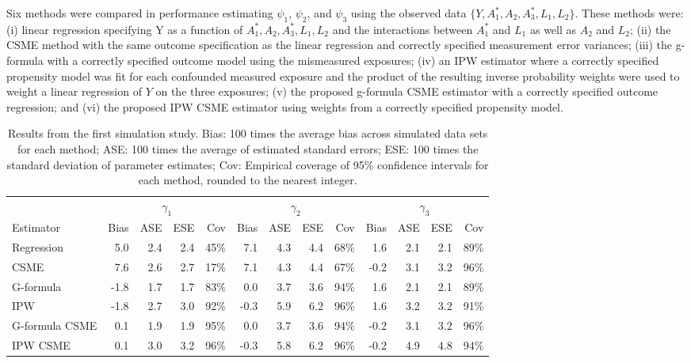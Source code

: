 \documentclass[useAMS,usenatbib,referee]{biom}
\begin{document}
Six methods were compared in performance estimating $\psi_{1}$, $\psi_{2}$, and $\psi_{3}$ using the observed data $\{ Y, A_{1}^{*}, A_{2}, A^{*}_{3}, L_{1}, L_{2} \}$. These methods were: (i) linear regression specifying Y as a function of $A_{1}^{*}, A_{2}, A^{*}_{3}, L_{1}, L_{2}$ and the interactions between $A_{1}^{*}$ and $L_{1}$ as well as $A_{2}$ and $L_{2}$; (ii) the CSME method with the same outcome specification as the linear regression and correctly specified measurement error variances; (iii) the g-formula with a correctly specified outcome model using the mismeasured exposures; (iv) an IPW estimator where a correctly specified propensity model was fit for each confounded measured exposure and the product of the resulting inverse probability weights were used to weight a linear regression of $Y$ on the three exposures; (v) the proposed g-formula CSME estimator with a correctly specified outcome regression; and (vi) the proposed IPW CSME estimator using weights from a correctly specified propensity model.

\begin{table}[]
    \footnotesize
    \caption{Results from the first simulation study. Bias: 100 times the average bias across simulated data sets for each method; ASE: 100 times the average of estimated standard errors; ESE: 100 times the standard deviation of parameter estimates; Cov: Empirical coverage of 95$\%$ confidence intervals for each method, rounded to the nearest integer.}
    \begin{center}
    \begin{tabular}{lrrrrrrrrrrrr}
    \hline
        & \multicolumn{4}{c}{$\gamma_{1}$} & \multicolumn{4}{c}{$\gamma_{2}$} & \multicolumn{4}{c}{$\gamma_{3}$} \\
        Estimator & Bias & ASE & ESE & Cov & Bias & ASE & ESE & Cov & Bias & ASE & ESE & Cov \\
         \hline
Regression & 5.0 & 2.4 & 2.4 & 45\% & 7.1 & 4.3 & 4.4 & 68\% & 1.6 & 2.1 & 2.1 & 89\% \\
CSME & 7.6 & 2.6 & 2.7 & 17\% & 7.1 & 4.3 & 4.4 & 67\% & -0.2 & 3.1 & 3.2 & 96\% \\
G-formula & -1.8 & 1.7 & 1.7 & 83\% & 0.0 & 3.7 & 3.6 & 94\% & 1.6 & 2.1 & 2.1 & 89\% \\
IPW & -1.8 & 2.7 & 3.0 & 92\% & -0.3 & 5.9 & 6.2 & 96\% & 1.6 & 3.2 & 3.2 & 91\% \\
G-formula CSME & 0.1 & 1.9 & 1.9 & 95\% & 0.0 & 3.7 & 3.6 & 94\% & -0.2 & 3.1 & 3.2 & 96\% \\
IPW CSME & 0.1 & 3.0 & 3.2 & 96\% & -0.3 & 5.8 & 6.2 & 96\% & -0.2 & 4.9 & 4.8 & 94\% \\
         \hline
    \end{tabular}
    \end{center}
    \label{tab:one}
\end{table}
\end{document}
